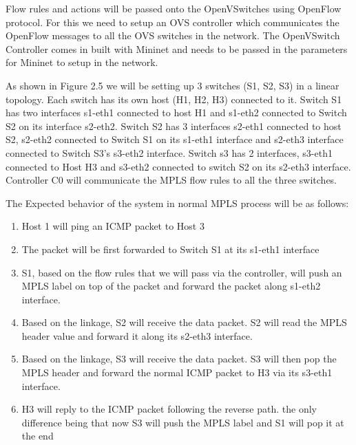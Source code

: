 Flow rules and actions will be passed onto the OpenVSwitches using OpenFlow protocol. For this we need to setup an OVS controller which communicates the OpenFlow messages to all the OVS switches in the network. The OpenVSwitch Controller comes in built with Mininet and needs to be passed in the parameters for Mininet to setup in the network.

As shown in Figure 2.5 we will be setting up 3 switches (S1, S2, S3) in a linear topology. Each switch has its own host (H1, H2, H3) connected to it. Switch S1 has two interfaces s1-eth1 connected to host H1 and s1-eth2 connected to Switch S2 on its interface s2-eth2. Switch S2 has 3 interfaces s2-eth1 connected to host S2, s2-eth2 connected to Switch S1 on its s1-eth1 interface and s2-eth3 interface connected to Switch S3's s3-eth2 interface. Switch s3 has 2 interfaces, s3-eth1 connected to Host H3 and s3-eth2 connected to switch S2 on its s2-eth3 interface. Controller C0 will communicate the MPLS flow rules to all the three switches.

The Expected behavior of the system in normal MPLS process will be as follows:
\begin{enumerate}
\item Host 1 will ping an ICMP packet to Host 3
\item The packet will be first forwarded to Switch S1 at its s1-eth1 interface
\item S1, based on the flow rules that we will pass via the controller, will push an MPLS label on top of the packet and forward the packet along s1-eth2 interface.
\item Based on the linkage, S2 will receive the data packet. S2 will read the MPLS header value and forward it along its s2-eth3 interface.
\item Based on the linkage, S3 will receive the data packet. S3 will then pop the MPLS header and forward the normal ICMP packet to H3 via its s3-eth1 interface.
\item H3 will reply to the ICMP packet following the reverse path. the only difference being that now S3 will push the MPLS label and S1 will pop it at the end
\end{enumerate}

